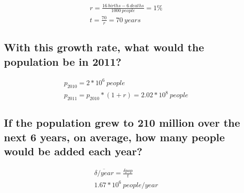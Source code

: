 \documentclass{article}
\begin{document}
\begin{gather}
    r = \frac{16\ births - 6\ deaths}{1000\ people} = 1\% \\
    t = \frac{70}{r} = 70\ years
\end{gather}

\subsection{With this growth rate, what would the population be in 2011?}

\begin{gather}
    p_{2010} = 2 * 10^6\ people \\
    p_{2011} = p_{2010} * (1 + r) = 2.02 * 10^8\ people
\end{gather}

\subsection{If the population grew to 210 million over the next 6 years, on average, how many people would be added each year? }

\begin{gather}
    \overline{\delta /year} = \frac{\delta pop}{t} \\
    1.67 * 10^6\ people/year
\end{gather}
\end{document}
